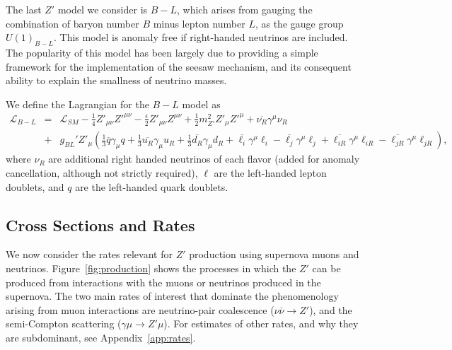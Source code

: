 \documentclass[11pt]{article}
\begin{document}
The last $Z'$ model we consider is $B-L$, which arises from gauging the combination of baryon number $B$ minus lepton number $L$, as the gauge group $U(1)_{B-L}$. This model is anomaly free if right-handed neutrinos are included. The popularity of this model has been largely due to providing a simple framework for the implementation of the seesaw mechanism, and its consequent ability to explain the smallness of neutrino masses.

We define the Lagrangian for the $B-L$ model as
    \begin{eqnarray}
 \mathcal{L}_{B-L} &=&\mathcal{L}_{SM}-\frac{1}{4}{Z}'_{\mu\nu}{Z}'^{\mu\nu}-\frac{\epsilon}{2}{Z}'_{\mu\nu}{Z}^{\mu\nu}+ \frac{1}{2}m_{Z'}^2 Z'_\mu Z'^\mu + \overline{\nu_R}\gamma^\mu\nu_R \\
 &+&g_{BL}'Z'_\mu\left(\frac{1}{3}\overline{q}\gamma_\mu q
 +\frac{1}{3}\overline{u_R}\gamma_\mu u_R
  +\frac{1}{3}\overline{d_R}\gamma_\mu d_R
 +\overline{\ell_i}\gamma^\mu\ell_i-\overline{\ell_j}\gamma^\mu\ell_j+\overline{\ell_{iR}}\gamma^\mu\ell_{iR}-\overline{\ell_{jR}}\gamma^\mu\ell_{jR}\right) \nonumber ,
 \label{eq:lagBL}
\end{eqnarray}
where $\nu_R$ are additional right handed neutrinos of each flavor (added for anomaly cancellation, although not strictly required), $\ell$ are the left-handed lepton doublets, and $q$ are the left-handed quark doublets.

\subsection{Cross Sections and Rates}

We now consider the rates relevant for $Z'$ production using supernova muons and neutrinos. Figure~\ref{fig:production} shows the processes in which the $Z'$ can be produced from interactions with the muons or neutrinos produced in the supernova. The two main rates of interest that dominate the phenomenology arising from muon interactions are neutrino-pair coalescence ($\nu\overline{\nu}\rightarrow Z'$), and the semi-Compton scattering ($\gamma\mu\rightarrow Z'\mu$). For estimates of other rates, and why they are subdominant, see Appendix~\ref{app:rates}. 
\end{document}
